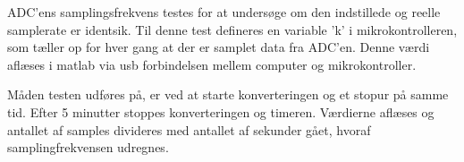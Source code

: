ADC'ens samplingsfrekvens testes for at undersøge om den indstillede og reelle samplerate er identsik. Til denne test defineres en variable 'k' i mikrokontrolleren, som tæller op for hver gang at der er samplet data fra ADC'en. Denne værdi aflæses i matlab via usb forbindelsen mellem computer og mikrokontroller. 

Måden testen udføres på, er ved at starte konverteringen og et stopur på samme tid. Efter 5 minutter stoppes konverteringen og timeren. Værdierne aflæses og antallet af samples divideres med antallet af sekunder gået, hvoraf samplingfrekvensen udregnes.  


%
%
